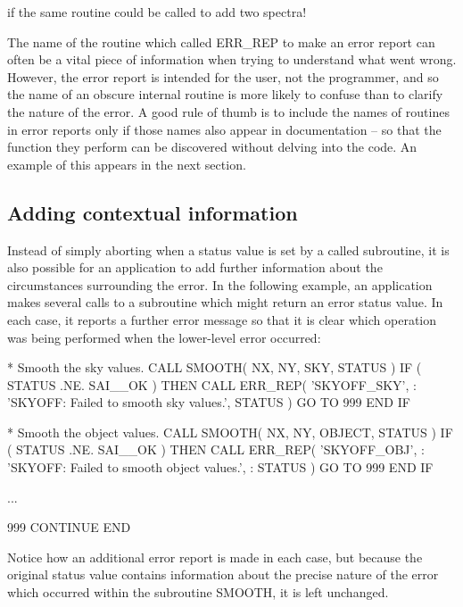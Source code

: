 \documentclass[twoside,11pt]{starlink}
\begin{document}
if the same routine could be called to add two spectra!

The name of the routine which called ERR\_REP to make an error report can
often be a vital piece of information when trying to understand what went
wrong.
However, the error report is intended for the user, not the programmer, and so
the name of an obscure internal routine is more likely to confuse than to
clarify the nature of the error.
A good rule of thumb is to include the names of routines in error reports
only if those names also appear in documentation -- so that the function
they perform can be discovered without delving into the code.
An example of this appears in the next section.


\subsection{Adding contextual information}

Instead of simply aborting when a status value is set by a called
subroutine, it is also possible for an application to add further information
about the circumstances surrounding the error.
In the following example, an application makes several calls to a subroutine
which might return an error status value.
In each case, it reports a further error message so that it is clear which
operation was being performed when the lower-level error occurred:

\begin {small}
\begin{terminalv}
*  Smooth the sky values.
      CALL SMOOTH( NX, NY, SKY, STATUS )
      IF ( STATUS .NE. SAI__OK ) THEN
         CALL ERR_REP( 'SKYOFF_SKY',
     :                'SKYOFF: Failed to smooth sky values.', STATUS )
         GO TO 999
      END IF

*  Smooth the object values.
      CALL SMOOTH( NX, NY, OBJECT, STATUS )
      IF ( STATUS .NE. SAI__OK ) THEN
         CALL ERR_REP( 'SKYOFF_OBJ',
     :                'SKYOFF: Failed to smooth object values.',
     :                STATUS )
         GO TO 999
      END IF

      ...

999   CONTINUE
      END
\end{terminalv}
\end {small}

Notice how an additional error report is made in each case, but because
the original status value contains information about the precise nature of
the error which occurred within the subroutine SMOOTH, it is left unchanged.
\end{document}

